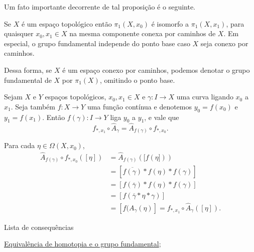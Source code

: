 Um fato importante decorrente de tal proposição é o seguinte.

\begin{corol}
    Se $X$ é um espaço topológico então $\pi_1(X,x_0)$ é isomorfo a $\pi_1(X,x_1)$, para quaisquer $x_0, x_1 \in X$ na mesma componente conexa por caminhos de $X$. Em especial, o grupo fundamental independe do ponto base caso $X$ seja conexo por caminhos.
\end{corol}

Dessa forma, se $X$ é um espaço conexo por caminhos, podemos denotar o grupo fundamental de $X$ por $\pi_1(X)$, omitindo o ponto base.

\begin{nota}
    Sejam $X$ e $Y$ espaços topológicos, $x_0, x_1\in X$ e $\gamma:I\to X$ uma curva ligando $x_0$ a $x_1$. Seja também $f: X\to Y$ uma função contínua e denotemos $y_0 = f(x_0)$ e $y_1 = f(x_1)$. Então $f(\gamma):I \to Y$ liga $y_0$ a $y_1$, e vale que
    \[f_{*,x_1} \circ \hat{A}_{\gamma} = \hat{A}_{f(\gamma)} \circ f_{*,x_0}.\]
    \begin{dem}
        Para cada $\eta \in \Omega(X,x_0)$,
        \begin{align*}
            \hat{A}_{f(\gamma)} \circ f_{*,x_0}([\eta])
            &= \hat{A}_{f(\gamma)} ([f(\eta]))\\
            &= [\overline{f(\gamma)} * f(\eta) * f(\gamma)]\\
            &= [f(\overline{\gamma}) * f(\eta) * f(\gamma)]\\
            &= [f(\overline{\gamma} * \eta * \gamma)]\\
            &= [f(A_{\gamma}(\eta)]
            = f_{*,x_1}\circ \hat{A}_{\gamma}([\eta]).
        \end{align*}
    \end{dem}
\end{nota}

\begin{titlemize}{Lista de consequências}
	\item \hyperref[equiv-homotopia-induz-iso]{Equivalência de homotopia e o grupo fundamental};\\ %
\end{titlemize}


